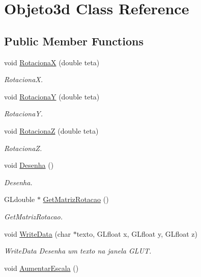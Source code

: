 \hypertarget{class_objeto3d}{\section{Objeto3d Class Reference}
\label{class_objeto3d}
}
\subsection*{Public Member Functions}
\begin{DoxyCompactItemize}
\item 
void \hyperlink{class_objeto3d_a22b95eda6eaa614054414960bba71975}{Rotaciona\+X} (double teta)
\begin{DoxyCompactList}\small\item\em Rotaciona\+X. \end{DoxyCompactList}\item 
void \hyperlink{class_objeto3d_abc3677a4f2f11189e5a5e0c20c58afbf}{Rotaciona\+Y} (double teta)
\begin{DoxyCompactList}\small\item\em Rotaciona\+Y. \end{DoxyCompactList}\item 
void \hyperlink{class_objeto3d_aa6b3be158f45ff94c2ba9edebfcdef75}{Rotaciona\+Z} (double teta)
\begin{DoxyCompactList}\small\item\em Rotaciona\+Z. \end{DoxyCompactList}\item 
\hypertarget{class_objeto3d_af2a8eb55a37b7433c81805967d84e101}{void \hyperlink{class_objeto3d_af2a8eb55a37b7433c81805967d84e101}{Desenha} ()}\label{class_objeto3d_af2a8eb55a37b7433c81805967d84e101}

\begin{DoxyCompactList}\small\item\em Desenha. \end{DoxyCompactList}\item 
G\+Ldouble $\ast$ \hyperlink{class_objeto3d_a1dff3d3ddcede978fce9e961c13b96d8}{Get\+Matriz\+Rotacao} ()
\begin{DoxyCompactList}\small\item\em Get\+Matriz\+Rotacao. \end{DoxyCompactList}\item 
void \hyperlink{class_objeto3d_a95dbd1c265ace9c4596c4c96552f28e1}{Write\+Data} (char $\ast$texto, G\+Lfloat x, G\+Lfloat y, G\+Lfloat z)
\begin{DoxyCompactList}\small\item\em Write\+Data Desenha um texto na janela G\+L\+U\+T. \end{DoxyCompactList}\item 
\hypertarget{class_objeto3d_a97c8c05fd5f78c4c380e5b1e78fbd3f2}{void \hyperlink{class_objeto3d_a97c8c05fd5f78c4c380e5b1e78fbd3f2}{Aumentar\+Escala} ()}\label{class_objeto3d_a97c8c05fd5f78c4c380e5b1e78fbd3f2}


\end{DoxyCompactItemize}

